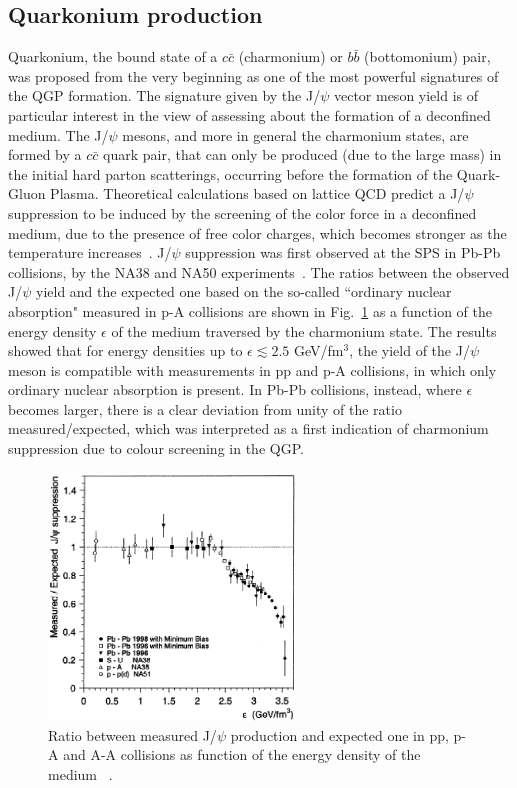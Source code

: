 \subsection{Quarkonium production}
Quarkonium, the bound state of a $c\bar{c}$ (charmonium) or $b\bar{b}$ 
(bottomonium) pair, was proposed from the very beginning as one of the 
most powerful signatures of the QGP formation.
The signature given by the J/$\psi$ vector meson yield is of particular interest
in the view of assessing about the formation of a deconfined medium.
The J/$\psi$ mesons, and more in general the charmonium states, are formed 
by a $c\bar{c}$ quark pair, that can only be produced (due to the large mass) 
in the initial hard parton scatterings, occurring before the formation of the 
Quark-Gluon Plasma. Theoretical calculations based on lattice QCD 
predict a J/$\psi$ suppression to be induced by the screening of the color 
force in a deconfined medium, due to the presence of free 
color charges, which becomes stronger as the temperature 
increases~\cite{Abreu:2000ni,Matsui:1986dk}. 
J/$\psi$ suppression was first observed at the SPS in Pb-Pb collisions, by 
the NA38 and NA50 experiments~\cite{Abreu:2000ni}.
The ratios between the observed J/$\psi$ yield and the expected one 
based on the so-called ``ordinary nuclear absorption" measured in p-A 
collisions are shown in Fig.~\ref{fig:JPsiSuppressionNA50} 
as a function of the energy density $\epsilon$ of the medium traversed by the charmonium state. 
The results showed that for energy densities up to $\epsilon \lesssim 2.5$ GeV/fm$^3$, 
the yield of the J/$\psi$ meson is compatible with measurements in pp 
and p-A collisions, in which only ordinary nuclear absorption is present. In Pb-Pb 
collisions, instead, where $\epsilon$ becomes larger, there is a clear deviation from 
unity of the ratio measured/expected, which was interpreted as a first indication of 
charmonium suppression due to colour screening in the QGP.
\begin{figure}[!ht]
  \centering
  \includegraphics[width=6.6cm]{FigCap1/JPsiSuppressionNA50.eps}
  \caption{Ratio between measured J/$\psi$ production and expected one in pp, p-A and A-A collisions as function of the energy density of the medium ~\cite{Abreu:2000ni}.}
  \label{fig:JPsiSuppressionNA50}
\end{figure}
